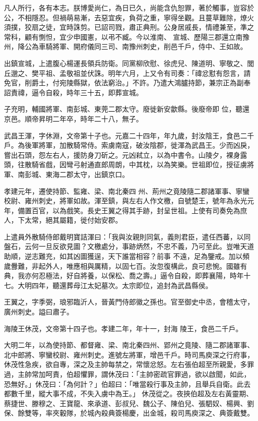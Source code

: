 \begin{pinyinscope}
 凡人所行，各有本志。朕博愛尚仁，為日已久，尚能含仇恕罪，著於觸事，豈容於公，不相隱忍。但禍萌易漸，去惡宜疾，負荷之重，寧得坐觀。且蔓草難除，燎火須撲，狡扇之徒，宜時誅剪。已詔司戮，肅正典刑。公身居戚長，情禮兼至，準之常科，顧有惻怛，宜少申國憲，以弔不臧。今以淮南、
 宣城、歷陽三郡還立南豫州，降公為車騎將軍、開府儀同三司、南豫州刺史，削邑千戶，侍中、王如故。



 出鎮宣城，上遣腹心楊運長領兵防衛。同黨柳欣慰、徐虎兒、陳道明、寧敬之、閭丘邈之、樊平祖、孟敬祖並伏誅。明年六月，上又令有司奏：「禕忿懟有怨言，請免官，削爵土，付宛陵縣獄，依法窮治。」不許。乃遣大鴻臚持節，兼宗正為副奉詔責禕，逼令自殺，時年三十五，即葬宣城。



 子充明，輔國將軍、南彭城、東莞二郡太守。廢徙新安歙縣。後廢帝即
 位，聽還京邑。順帝昇明二年卒，時年二十八，無子。



 武昌王渾，字休淵，文帝第十子也。元嘉二十四年，年九歲，封汝陰王，食邑二千戶。為後軍將軍，加散騎常侍。索虜南寇，破汝陰郡，徙渾為武昌王。少而凶戾，嘗出石頭，怨左右人，援防身刀斫之。元凶弒立，以為中書令。山陵夕，裸身露頭，往散騎省戲，因彎弓射通直郎周朗，中其枕，以為笑樂。世祖即位，授征虜將軍、南彭城、東海二郡太守，出鎮京口。



 孝建元年，遷使持節、監雍、梁、南北秦四
 州、荊州之竟陵隨二郡諸軍事、寧蠻校尉、雍州刺史，將軍如故。渾至鎮，與左右人作文檄，自號楚王，號年為永光元年，備置百官，以為戲笑。長史王翼之得其手跡，封呈世祖。上使有司奏免為庶人，下太常，絕其屬籍，徙付始安郡。



 上遣員外散騎侍郎戴明寶詰渾曰：「我與汝親則同氣，義則君臣，遣任西蕃，以同盤石，云何一旦反欲見圖？文檄處分，事跡炳然，不忠不義，乃可至此。豈唯天道助順，逆志難充，如其凶圖獲逞，天下誰當相容？前事
 不遠，足為鑒戒。加以頻歲釁難，非起外人，唯應相與厲精，以固七百。汝忽復構此，良可悲惋。國雖有典，我亦何忍極法，好自將養，以保松、喬之壽。」逼令自殺，即葬襄陽，時年十七。大明四年，聽還葬母江太妃墓次。太宗即位，追封為武昌縣侯。



 王翼之，字季弼，琅邪臨沂人，晉黃門侍郎徽之孫也。官至御史中丞，會稽太守，廣州刺史。謚曰肅子。



 海陵王休茂，文帝第十四子也。孝建二年，年十一，封海
 陵王，食邑二千戶。



 大明二年，以為使持節、都督雍、梁、南北秦四州、郢州之竟陵、隨二郡諸軍事、北中郎將、寧蠻校尉、雍州刺史。進號左將軍，增邑千戶。時司馬庾深之行府事，休茂性急疾，欲自專，深之及主帥每禁之，常懷忿怒。左右張伯超至所親愛，多罪過，主帥常加呵責，伯超懼罪，謂休茂曰：「主帥密疏官罪過，欲以啟聞，如此，恐無好。」休茂曰：「為何計？」伯超曰：「唯當殺行事及主帥，且舉兵自衛。此去都數千里，縱大事不成，不失入虜中為王。」
 休茂從之。夜挾伯超及左右黃靈期、蔡捷世、滕穆之、王寶龍、來承道、彭叔兒、魏公子、陳伯兒、張駟奴、楊興、劉保、餘雙等，率夾轂隊，於城內殺典簽楊慶，出金城，殺司馬庾深之、典簽戴雙。




\end{pinyinscope}
